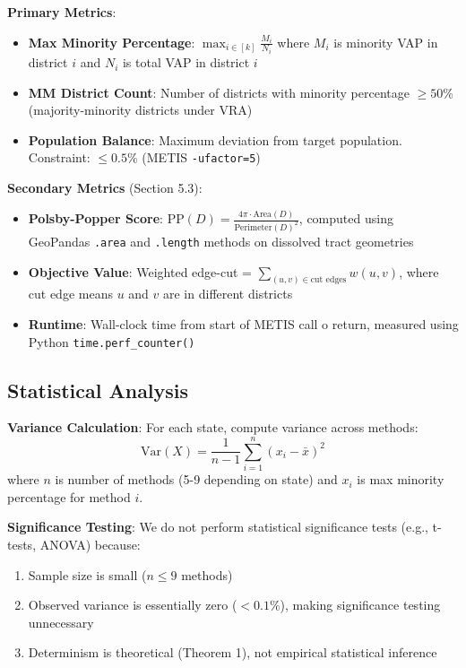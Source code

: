 \textbf{Primary Metrics}:
\begin{itemize}
    \item \textbf{Max Minority Percentage}: $\max_{i \in [k]} \frac{M_i}{N_i}$ where $M_i$ is minority VAP in district $i$ and $N_i$ is total VAP in district $i$

    \item \textbf{MM District Count}: Number of districts with minority percentage $\geq 50\%$ (majority-minority districts under VRA)

    \item \textbf{Population Balance}: Maximum deviation from target population. Constraint: $\leq 0.5\%$ (METIS \texttt{-ufactor=5})
\end{itemize}

\textbf{Secondary Metrics} (Section 5.3):
\begin{itemize}
    \item \textbf{Polsby-Popper Score}: $\text{PP}(D) = \frac{4\pi \cdot \text{Area}(D)}{\text{Perimeter}(D)^2}$, computed using GeoPandas \texttt{.area} and \texttt{.length} methods on dissolved tract geometries

    \item \textbf{Objective Value}: Weighted edge-cut = $\sum_{(u,v) \in \text{cut edges}} w(u,v)$, where cut edge means $u$ and $v$ are in different districts

    \item \textbf{Runtime}: Wall-clock time from start of METIS call 	o return, measured using Python \texttt{time.perf\_counter()}
\end{itemize}

\subsection{Statistical Analysis}

\textbf{Variance Calculation}:
For each state, compute variance across methods:
\[
\text{Var}(X) = \frac{1}{n-1} \sum_{i=1}^{n} (x_i - \bar{x})^2
\]
where $n$ is number of methods (5-9 depending on state) and $x_i$ is max minority percentage for method $i$.

\textbf{Significance Testing}:
We do not perform statistical significance tests (e.g., t-tests, ANOVA) because:
\begin{enumerate}
    \item Sample size is small ($n \leq 9$ methods)
    \item Observed variance is essentially zero ($< 0.1\%$), making significance testing unnecessary
    \item Determinism is theoretical (Theorem 1), not empirical statistical inference
\end{enumerate}

